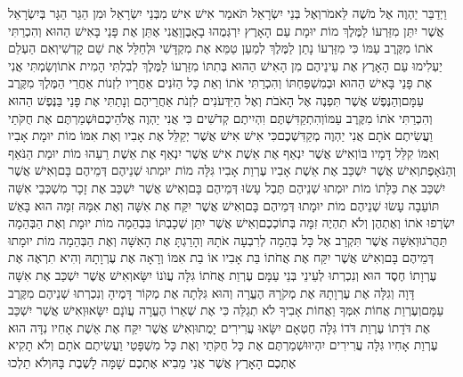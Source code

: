 \documentclass[../main/main.tex]{subfiles}
\begin{document}
\begin{multicols*}{\ncols}
וַיְדַבֵּר יַהְוֶה אֶל מֹשֶׁה לֵּאמֹר\PreVerseSpace{}וְאֶל בְּנֵי יִשְׂרָאֵל תֹּאמַר אִישׁ אִישׁ מִבְּנֵי יִשְׂרָאֵל וּמִן הַגֵּר הַגָּר בְּיִשְׂרָאֵל אֲשֶׁר יִתֵּן מִזַּרְעוֹ לַמֶּלֶךְ מוֹת יוּמָת עַם הָאָרֶץ יִרְגְּמֻהוּ בָאָבֶן\PreVerseSpace{}וַאֲנִי אֶתֵּן אֶת פָּנַי בָּאִישׁ הַהוּא וְהִכְרַתִּי אֹתוֹ מִקֶּרֶב עַמּוֹ כִּי מִזַּרְעוֹ נָתַן לַמֶּלֶךְ לְמַעַן טַמֵּא אֶת מִקְדָּשִׁי וּלְחַלֵּל אֶת שֵׁם קָדְשִׁי\PreVerseSpace{}וְאִם הַעְלֵם יַעְלִימוּ עַם הָאָרֶץ אֶת עֵינֵיהֶם מִן הָאִישׁ הַהוּא בְּתִתּוֹ מִזַּרְעוֹ לַמֶּלֶךְ לְבִלְתִּי הָמִית אֹתוֹ\PreVerseSpace{}וְשַׂמְתִּי אֲנִי אֶת פָּנַי בָּאִישׁ הַהוּא וּבְמִשְׁפַּחְתּוֹ וְהִכְרַתִּי אֹתוֹ וְאֵת כָּל הַזֹּנִים אַחֲרָיו לִזְנוֹת אַחֲרֵי הַמֶּלֶךְ מִקֶּרֶב עַמָּם\PreVerseSpace{}וְהַנֶּפֶשׁ אֲשֶׁר תִּפְנֶה אֶל הָאֹבֹת וְאֶל הַיִּדְּעֹנִים לִזְנֹת אַחֲרֵיהֶם וְנָתַתִּי אֶת פָּנַי בַּנֶּפֶשׁ הַהוּא וְהִכְרַתִּי אֹתוֹ מִקֶּרֶב עַמּוֹ\PreVerseSpace{}וְהִתְקַדִּשְׁתֶּם וִהְיִיתֶם קְדֹשִׁים כִּי אֲנִי יַהְוֶה אֱלֹהֵיכֶם\PreVerseSpace{}וּשְׁמַרְתֶּם אֶת חֻקֹּתַי וַעֲשִׂיתֶם אֹתָם אֲנִי יַהְוֶה מְקַדִּשְׁכֶם\PreVerseSpace{}כִּי אִישׁ אִישׁ אֲשֶׁר יְקַלֵּל אֶת אָבִיו וְאֶת אִמּוֹ מוֹת יוּמָת אָבִיו וְאִמּוֹ קִלֵּל דָּמָיו בּוֹ\PreVerseSpace{}וְאִישׁ אֲשֶׁר יִנְאַף אֶת אֵשֶׁת אִישׁ אֲשֶׁר יִנְאַף אֶת אֵשֶׁת רֵעֵהוּ מוֹת יוּמַת הַנֹּאֵף וְהַנֹּאָפֶת\PreVerseSpace{}וְאִישׁ אֲשֶׁר יִשְׁכַּב אֶת אֵשֶׁת אָבִיו עֶרְוַת אָבִיו גִּלָּה מוֹת יוּמְתוּ שְׁנֵיהֶם דְּמֵיהֶם בָּם\PreVerseSpace{}וְאִישׁ אֲשֶׁר יִשְׁכַּב אֶת כַּלָּתוֹ מוֹת יוּמְתוּ שְׁנֵיהֶם תֶּבֶל עָשׂוּ דְּמֵיהֶם בָּם\PreVerseSpace{}וְאִישׁ אֲשֶׁר יִשְׁכַּב אֶת זָכָר מִשְׁכְּבֵי אִשָּׁה תּוֹעֵבָה עָשׂוּ שְׁנֵיהֶם מוֹת יוּמָתוּ דְּמֵיהֶם בָּם\PreVerseSpace{}וְאִישׁ אֲשֶׁר יִקַּח אֶת אִשָּׁה וְאֶת אִמָּהּ זִמָּה הוּא בָּאֵשׁ יִשְׂרְפוּ אֹתוֹ וְאֶתְהֶן וְלֹא תִהְיֶה זִמָּה בְּתוֹכְכֶם\PreVerseSpace{}וְאִישׁ אֲשֶׁר יִתֵּן שְׁכָבְתּוֹ בִּבְהֵמָה מוֹת יוּמָת וְאֶת הַבְּהֵמָה תַּהֲרֹגוּ\PreVerseSpace{}וְאִשָּׁה אֲשֶׁר תִּקְרַב אֶל כָּל בְּהֵמָה לְרִבְעָה אֹתָהּ וְהָרַגְתָּ אֶת הָאִשָּׁה וְאֶת הַבְּהֵמָה מוֹת יוּמָתוּ דְּמֵיהֶם בָּם\PreVerseSpace{}וְאִישׁ אֲשֶׁר יִקַּח אֶת אֲחֹתוֹ בַּת אָבִיו אוֹ בַת אִמּוֹ וְרָאָה אֶת עֶרְוָתָהּ וְהִיא תִרְאֶה אֶת עֶרְוָתוֹ חֶסֶד הוּא וְנִכְרְתוּ לְעֵינֵי בְּנֵי עַמָּם עֶרְוַת אֲחֹתוֹ גִּלָּה עֲוֺנוֹ יִשָּׂא\PreVerseSpace{}וְאִישׁ אֲשֶׁר יִשְׁכַּב אֶת אִשָּׁה דָּוָה וְגִלָּה אֶת עֶרְוָתָהּ אֶת מְקֹרָהּ הֶעֱרָה וְהוּא\SubEnd{} גִּלְּתָה אֶת מְקוֹר דָּמֶיהָ וְנִכְרְתוּ שְׁנֵיהֶם מִקֶּרֶב עַמָּם\PreVerseSpace{}וְעֶרְוַת אֲחוֹת אִמְּךָ וַאֲחוֹת אָבִיךָ לֹא תְגַלֵּה כִּי אֶת שְׁאֵרוֹ הֶעֱרָה עֲוֺנָם יִשָּׂאוּ\PreVerseSpace{}וְאִישׁ אֲשֶׁר יִשְׁכַּב אֶת דֹּדָתוֹ עֶרְוַת דֹּדוֹ גִּלָּה חֶטְאָם יִשָּׂאוּ עֲרִירִים יָמֻתוּ\PreVerseSpace{}וְאִישׁ אֲשֶׁר יִקַּח אֶת אֵשֶׁת אָחִיו נִדָּה הוּא עֶרְוַת אָחִיו גִּלָּה עֲרִירִים יִהְיוּ\PreVerseSpace{}וּשְׁמַרְתֶּם אֶת כָּל חֻקֹּתַי וְאֶת כָּל מִשְׁפָּטַי וַעֲשִׂיתֶם אֹתָם וְלֹא תָקִיא אֶתְכֶם הָאָרֶץ אֲשֶׁר אֲנִי מֵבִיא אֶתְכֶם שָׁמָּה לָשֶׁבֶת בָּהּ\PreVerseSpace{}וְלֹא תֵלְכוּ 
\end{multicols*}
\end{document}
